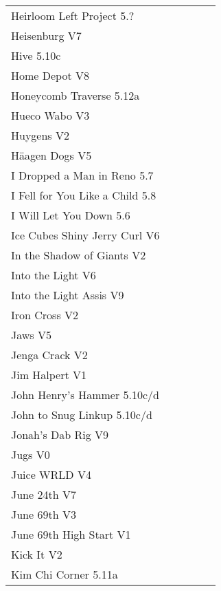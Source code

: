 \begin{flushleft}
\begin{center}
\begin{supertabular}{p{0.76\linewidth}p{0.08\linewidth}}
Heirloom Left Project 5.? & \pageref{vr:Heirloom Left Project} \\
Heisenburg V7 & \pageref{rt:Heisenburg} \\
Hive 5.10c & \pageref{rt:Hive} \\
Home Depot V8 & \pageref{vr:Harbor Freight Right Exit} \\
Honeycomb Traverse 5.12a & \pageref{vr:Honeycomb Traverse} \\
Hueco Wabo V3 & \pageref{rt:Hueco Wabo} \\
Huygens V2 & \pageref{rt:Huygens} \\
Häagen Dogs V5 & \pageref{rt:Häagen Dogs} \\
I Dropped a Man in Reno 5.7 & \pageref{rt:I Dropped a Man in Reno} \\
I Fell for You Like a Child 5.8 & \pageref{rt:I Fell for You Like a Child} \\
I Will Let You Down 5.6 & \pageref{rt:I Will Let You Down} \\
Ice Cubes Shiny Jerry Curl V6 & \pageref{rt:Ice Cubes Shiny Jerry Curl} \\
In the Shadow of Giants V2 & \pageref{rt:In the Shadow of Giants} \\
Into the Light V6 & \pageref{rt:Into the Light} \\
Into the Light Assis V9 & \pageref{vr:Into the Light Assis} \\
Iron Cross V2 & \pageref{vr:Iron Cross} \\
Jaws V5 & \pageref{rt:Jaws} \\
Jenga Crack V2 & \pageref{vr:Crack 2} \\
Jim Halpert V1 & \pageref{rt:Jim Halpert} \\
John Henry's Hammer 5.10c/d & \pageref{rt:John Henry's Hammer} \\
John to Snug Linkup 5.10c/d & \pageref{vr:John to Snug Linkup} \\
Jonah's Dab Rig V9 & \pageref{rt:Jonah's Dab Rig} \\
Jugs V0 & \pageref{rt:Jugs} \\
Juice WRLD V4 & \pageref{vr:Juice WRLD} \\
June 24th V7 & \pageref{rt:June 24th} \\
June 69th V3 & \pageref{rt:June 69th} \\
June 69th High Start V1 & \pageref{vr:June 69th High Start} \\
Kick It V2 & \pageref{rt:Kick It} \\
Kim Chi Corner 5.11a & \pageref{rt:Kim Chi Corner} \\

\end{supertabular}
\end{center}
\end{flushleft}
